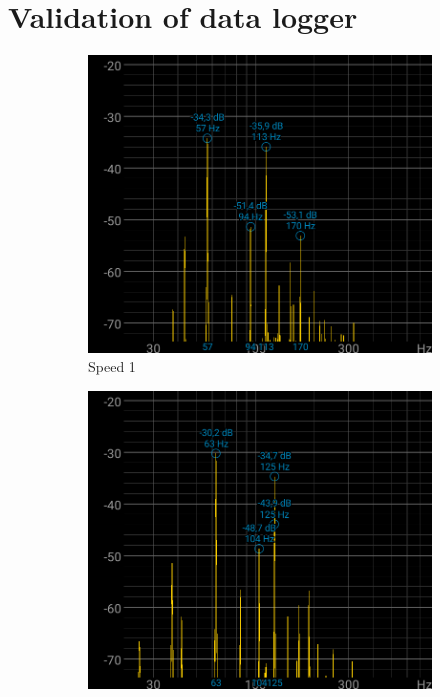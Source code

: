 \section{Validation of data logger}
\begin{figure}[ht]
    \centering
    \begin{subfigure}[b]{0.3\textwidth}
        \includegraphics[width=\textwidth]{assets/results/standing-fan/fan-audio-speed-1.png}
        \caption{Speed 1}
    \end{subfigure}
    \hfill
    \begin{subfigure}[b]{0.3\textwidth}
        \includegraphics[width=\textwidth]{assets/results/standing-fan/fan-audio-speed-2.png}

\end{subfigure}
\end{figure}
